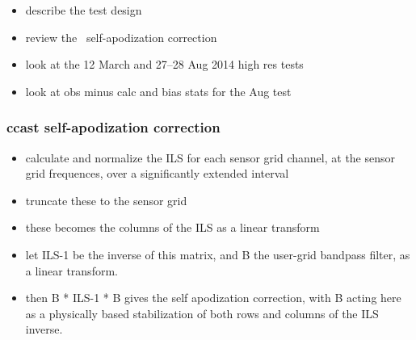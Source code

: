 
\begin{itemize}
  \item describe the test design

  \item review the \ccast\ self-apodization correction

  \item look at the 12 March and 27--28 Aug 2014 high res tests

  \item look at obs minus calc and bias stats for the Aug test

\end{itemize}

\begin{frame}
\frametitle{ccast self-apodization correction}

\begin{itemize}
  \item calculate and normalize the ILS for each sensor grid
    channel, at the sensor grid frequences, over a significantly
    extended interval

  \item truncate these to the sensor grid 

  \item these becomes the columns of the ILS as a linear transform

  \item let ILS-1 be the inverse of this matrix, and B the user-grid
    bandpass filter, as a linear transform.

 \item then B * ILS-1 * B gives the self apodization correction,
   with B acting here as a physically based stabilization of both
   rows and columns of the ILS inverse.

\end{itemize}

\end{frame}
